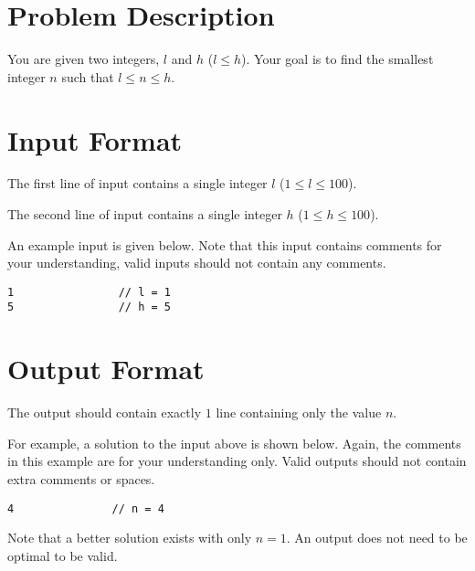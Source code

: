

\section{Problem Description}

You are given two integers, $l$ and $h$ ($l \leq h$).  Your goal is to
find the smallest integer $n$ such that $l \leq n \leq h$.

\section{Input Format}

The first line of input contains a single integer $l$ ($1 \leq l \leq 100$).

The second line of input contains a single integer $h$ ($1 \leq h \leq 100$).

An example input is given below.  Note that this input contains
comments for your understanding, valid inputs should not contain any
comments.

\begin{verbatim}
1                // l = 1
5                // h = 5
\end{verbatim}

\section{Output Format}

The output should contain exactly $1$ line containing only the value
$n$.

For example, a solution to the input above is shown below.  Again, the
comments in this example are for your understanding only.  Valid
outputs should not contain extra comments or spaces.

\begin{verbatim}
4               // n = 4
\end{verbatim}

Note that a better solution exists with only $n = 1$.  An output does
not need to be optimal to be valid.